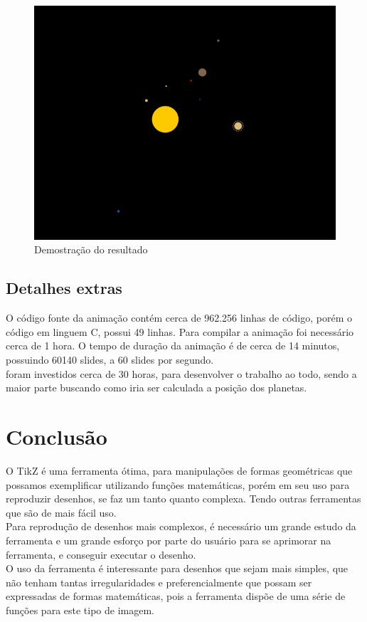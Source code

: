 \documentclass[
	12pt,				%
	openright,			%
	oneside,
	a4paper,			%
	english,			%
	french,				%
	spanish,			%
	brazil,				%
	]{abntex2}
\begin{document}
	\begin{figure}[h]
		\centering
		\includegraphics[width=0.5\linewidth]{screenshot004}
		\caption{Demostração do resultado}
		\label{fig:screenshot004}
	\end{figure}
	
	
\section{Detalhes extras}
	O código fonte da animação contém cerca de 962.256 linhas de código, porém o código em linguem C, possui 49 linhas. Para compilar a animação foi necessário cerca de 1 hora. O tempo de duração da animação é de cerca de 14 minutos, possuindo 60140 slides, a 60 slides por segundo.
	\\ \indent foram investidos cerca de 30 horas, para desenvolver o trabalho ao todo, sendo a maior parte buscando como iria ser calculada a posição dos planetas.

\chapter[Conclusão]{Conclusão}
	O TikZ é uma ferramenta ótima, para manipulações de formas geométricas que possamos exemplificar utilizando funções matemáticas, porém em seu uso para reproduzir desenhos, se faz um tanto quanto complexa. Tendo outras ferramentas que são de mais fácil uso.
	\\ \indent Para reprodução de desenhos mais complexos, é necessário um grande estudo da ferramenta e um grande esforço por parte do usuário para se aprimorar na ferramenta, e conseguir executar o desenho.
	\\ \indent O uso da ferramenta é interessante para desenhos que sejam mais simples, que não tenham tantas irregularidades e preferencialmente que possam ser expressadas de formas matemáticas, pois a ferramenta dispõe de uma série de funções para este tipo de imagem.
\end{document}
